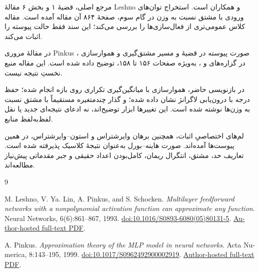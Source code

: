 مرجع اصلی، قضیهٔ ۱ و بخش ۶ مقالهٔ Leshno و همکاران \cite{leshno1993} است. استخراج توان‌های ورودی با مشتق نسبت به وزن در گام سوم، صفحهٔ ۸۶۴ آن مقاله آمده است. مقاله کلاس عمومی‌تری از فعال‌سازی‌ها را بررسی می‌کند؛ این سند فقط حالت پیوسته را اثبات می‌کند.

در مقالهٔ مروری Pinkus \cite{pinkus1999}، صورت پیوسته در قضیهٔ  و مسیر مشتق‌گیری و هموارسازی در گزاره‌های  و ، به‌ویژه صفحات ۱۵۶ تا ۱۵۸، توضیح داده شده است. این مقاله منبع نخستِ نتیجه نیست.

در بازنویسی حاضر، هموارسازی با میانگین‌گیری تکراری روی بازه انجام شده؛ حفظ درجه با درون‌یابی لاگرانژ نشان داده شده؛ و گذار چندمتغیره مستقیماً با مشتق نسبت به وزن‌ها نوشته شده است. این تغییرها ابزار توضیح‌اند، نه ادعای نتیجه‌ای جدید یا نقل لفظ‌به‌لفظ منابع.

لم‌های اختصاصیِ اثبات، همچنین برهان وایرشتراس و استون–وایرشتراس، در همین پیوست‌ها آمده‌اند. صورت هاینه–بورل به‌عنوان نتیجهٔ کلاسیک پذیرفته شده است. تعاریف حد، مشتق، انتگرال ریمان، کامل‌بودن اعداد حقیقی و جبر مقدماتی پیش‌نیاز مطالعه‌اند.

\renewcommand{\refname}{مراجع}
\begin{thebibliography}{9}
\begin{latin}
M. Leshno, V. Ya. Lin, A. Pinkus, and S. Schocken.
\textit{Multilayer feedforward networks with a nonpolynomial activation function can approximate any function}.
Neural Networks, 6(6):861--867, 1993.
\href{https://doi.org/10.1016/S0893-6080(05)80131-5}{doi:10.1016/S0893-6080(05)80131-5}.
\newline
\href{https://pinkus.net.technion.ac.il/files/2021/02/neural.pdf}{Author-hosted full-text PDF}.

A. Pinkus.
\textit{Approximation theory of the MLP model in neural networks}.
Acta Numerica, 8:143--195, 1999.
\href{https://doi.org/10.1017/S0962492900002919}{doi:10.1017/S0962492900002919}.
\newline
\href{https://pinkus.net.technion.ac.il/files/2021/02/acta.pdf}{Author-hosted full-text PDF}.
\end{latin}
\end{thebibliography}

